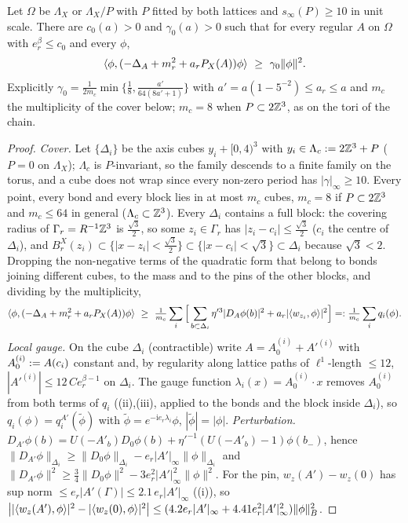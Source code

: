 \begin{lemma}\label{rot:hyb:lem:coer}
Let $\Omega$ be $\Lambda_X$ or $\Lambda_X/P$ with $P$ fitted by both lattices and $s_\infty(P)\ge10$ in unit scale. There are $c_0(a)>0$ and $\gamma_0(a)>0$ such that for every regular $A$ on $\Omega$ with $e_r^\beta\le c_0$ and every $\phi$,
\[
\ip{\phi}{(-\Delta_A+m_r^2+a_rP_X(A))\phi}\ \ge\ \gamma_0\|\phi\|^2 .
\]
Explicitly $\gamma_0=\frac1{2m_c}\min\{\frac18,\frac{a'}{64(8a'+1)}\}$ with $a'=a(1-5^{-2})\le a_r\le a$ and $m_c$ the multiplicity of the cover below; $m_c=8$ when $P\subset2\mathbb Z^3$, as on the tori of the chain.
\end{lemma}
\begin{proof}
\emph{Cover.} Let $\{\Delta_i\}$ be the axis cubes $y_i+[0,4)^3$ with $y_i\in\Lambda_c:=2\mathbb Z^3+P$ ($P=0$ on $\Lambda_X$); $\Lambda_c$ is $P$-invariant, so the family descends to a finite family on the torus, and a cube does not wrap since every non-zero period has $|\gamma|_\infty\ge10$. Every point, every bond and every block lies in at most $m_c$ cubes, $m_c=8$ if $P\subset2\mathbb Z^3$ and $m_c\le64$ in general ($\Lambda_c\subset\mathbb Z^3$). Every $\Delta_i$ contains a full block: the covering radius of $\Gamma_r=R^{-1}\mathbb Z^3$ is $\frac{\sqrt3}2$, so some $z_i\in\Gamma_r$ has $|z_i-c_i|\le\frac{\sqrt3}2$ ($c_i$ the centre of $\Delta_i$), and $B^X_r(z_i)\subset\{|x-z_i|<\frac{\sqrt3}2\}\subset\{|x-c_i|<\sqrt3\}\subset\Delta_i$ because $\sqrt3<2$. Dropping the non-negative terms of the quadratic form that belong to bonds joining different cubes, to the mass and to the pins of the other blocks, and dividing by the multiplicity,
\[
\ip{\phi}{(-\Delta_A+m_r^2+a_rP_X(A))\phi}\ \ge\ \tfrac1{m_c}\sum_i\Big[\sum_{b\subset\Delta_i}\eta'^3|D_A\phi(b)|^2+a_r|\ip{w_{z_i}}{\phi}|^2\Big]=:\tfrac1{m_c}\sum_iq_i(\phi).
\]
\emph{Local gauge.} On the cube $\Delta_i$ (contractible) write $A=A_0^{(i)}+A'^{(i)}$ with $A_0^{(i)}:= A(c_i)$ constant and, by regularity along lattice paths of $\ell^1$-length $\le12$, $|A'^{(i)}|\le12\,Ce_r^{\beta-1}$ on $\Delta_i$. The gauge function $\lambda_i(x)=A_0^{(i)}\cdot x$ removes $A_0^{(i)}$ from both terms of $q_i$ ((ii),(iii), applied to the bonds and the block inside $\Delta_i$), so $q_i(\phi)=q_i^{A'}(\tilde\phi)$ with $\tilde\phi=e^{-\mathrm ie_r\lambda_i}\phi$, $|\tilde\phi|=|\phi|$.
\emph{Perturbation.} $D_{A'}\phi(b)=U(-A'_b)D_0\phi(b)+\eta'^{-1}(U(-A'_b)-1)\phi(b_-)$, hence $\|D_{A'}\phi\|_{\Delta_i}\ge\|D_0\phi\|_{\Delta_i}-e_r|A'|_\infty\|\phi\|_{\Delta_i}$ and $\|D_{A'}\phi\|^2\ge\frac34\|D_0\phi\|^2-3e_r^2|A'|_\infty^2\|\phi\|^2$. For the pin, $w_z(A')-w_z(0)$ has sup norm $\le e_r|A'(\Gamma)|\le2.1\,e_r|A'|_\infty$ ((i)), so $\big||\langle w_z(A'),\phi\rangle|^2-|\langle w_z(0),\phi\rangle|^2\big|\le(4.2e_r|A'|_\infty+4.41e_r^2|A'|_\infty^2)\|\phi\|_B^2$.

\end{proof}

